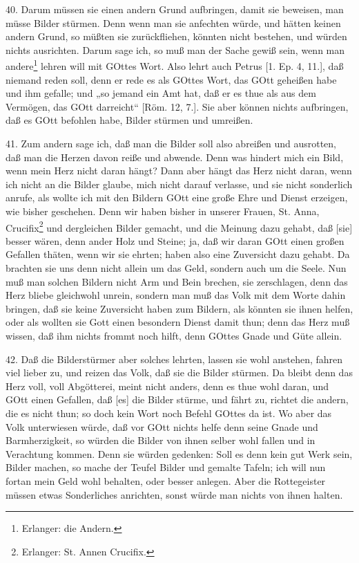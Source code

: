 40. Darum müssen sie einen andern Grund aufbringen, damit sie beweisen, man müsse Bilder stürmen. Denn wenn man sie anfechten würde, und hätten keinen andern Grund, so müßten sie zurückfliehen, könnten nicht bestehen, und würden nichts ausrichten. Darum sage ich, so muß man der Sache gewiß sein, wenn man andere\footnote{Erlanger: die Andern.} lehren will mit GOttes Wort. Also lehrt auch Petrus [1. Ep. 4, 11.], daß niemand reden soll, denn er rede es als GOttes Wort, das GOtt geheißen habe und ihm gefalle; und „so jemand ein Amt hat, daß er es thue als aus dem Vermögen, das GOtt darreicht“ [Röm. 12, 7.]. Sie aber können nichts aufbringen, daß es GOtt befohlen habe, Bilder stürmen und umreißen.

41. Zum andern sage ich, daß man die Bilder soll also abreißen und ausrotten, daß man die Herzen davon reiße und abwende. Denn was hindert mich ein Bild, wenn mein Herz nicht daran hängt? Dann aber hängt das Herz nicht daran, wenn ich nicht an die Bilder glaube, mich nicht darauf verlasse, und sie nicht sonderlich anrufe, als wollte ich mit den Bildern GOtt eine große Ehre und Dienst erzeigen, wie bisher geschehen. Denn wir haben bisher in unserer Frauen, St. Anna, Crucifix\footnote{Erlanger: St. Annen Crucifix.} und dergleichen Bilder gemacht, und die Meinung dazu gehabt, daß [sie] besser wären, denn ander Holz und Steine; ja, daß wir daran GOtt einen großen Gefallen thäten, wenn wir sie ehrten; haben also eine Zuversicht dazu gehabt. Da brachten sie uns denn nicht allein um das Geld, sondern auch um die Seele. Nun muß man solchen Bildern nicht Arm und Bein brechen, sie zerschlagen, denn das Herz bliebe gleichwohl unrein, sondern man muß das Volk mit dem Worte dahin bringen, daß sie keine Zuversicht haben zum Bildern, als könnten sie ihnen helfen, oder als wollten sie Gott einen besondern Dienst damit thun; denn das Herz muß wissen, daß ihm nichts frommt noch hilft, denn GOttes Gnade und Güte allein.

42. Daß die Bilderstürmer aber solches lehrten, lassen sie wohl anstehen, fahren viel lieber zu, und reizen das Volk, daß sie die Bilder stürmen. Da bleibt denn das Herz voll, voll Abgötterei, meint nicht anders, denn es thue wohl daran, und GOtt einen Gefallen, daß [es] die Bilder stürme, und fährt zu, richtet die andern, die es nicht thun; so doch kein Wort noch Befehl GOttes da ist. Wo aber das Volk unterwiesen würde, daß vor GOtt nichts helfe denn seine Gnade und Barmherzigkeit, so würden die Bilder von ihnen selber wohl fallen und in Verachtung kommen. Denn sie würden gedenken: Soll es denn kein gut Werk sein, Bilder machen, so mache der Teufel Bilder und gemalte Tafeln; ich will nun fortan mein Geld wohl behalten, oder besser anlegen. Aber die Rottegeister müssen etwas Sonderliches anrichten, sonst würde man nichts von ihnen halten.

